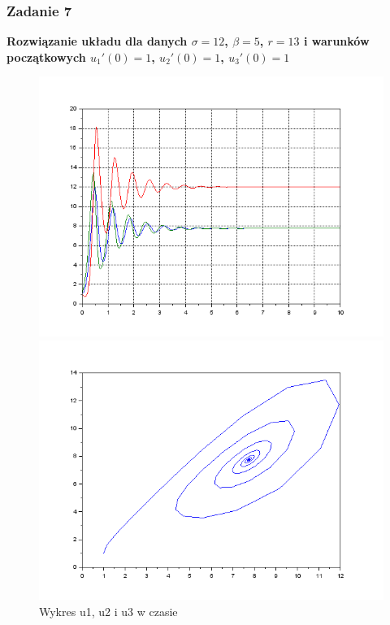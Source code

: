 \documentclass[12pt]{article}
\begin{document}
\newpage
\subsubsection{Zadanie 7}
\begin{center}
\textbf{Rozwiązanie układu dla danych $\sigma = 12$, $\beta=5$, $r=13$ i warunków początkowych $u_1'(0)=1$, $u_2'(0)=1$, $u_3'(0)=1$}
\begin{figure}[H]
  \centering
  \begin{minipage}[b]{0.49\textwidth}
    \includegraphics[scale=0.4]{./img/7-111-xy}
    \caption{Wykres u1, u2 i u3 w czasie}
    \end{minipage}
  \hfill
  \begin{minipage}[b]{0.49\textwidth}
    \includegraphics[scale=0.4]{./img/7-111-phase-1-2}

\end{minipage}
\end{figure}
\end{center}
\end{document}
